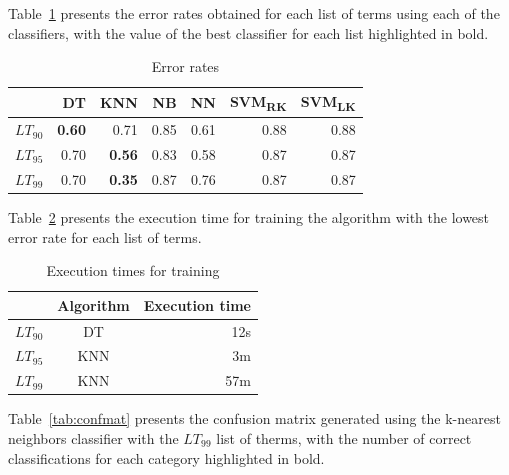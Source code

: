 \documentclass[conference]{IEEEtran}
\begin{document}
Table~\ref{tab:error} presents the error rates obtained for each list
of terms using each of the classifiers, with the value of the best
classifier for each list highlighted in bold.

\begin{table}[htbp]
    \caption{Error rates}
\begin{center}
\begin{tabular}{l|rrrrrr}
                 & DT            & KNN           & NB   & NN   & SVM\textsubscript{RK} & SVM\textsubscript{LK} \\ \hline
    $LT_{90}$    & \textbf{0.60} & 0.71          & 0.85 & 0.61 & 0.88                  & 0.88                  \\
    $LT_{95}$    & 0.70          & \textbf{0.56} & 0.83 & 0.58 & 0.87                  & 0.87                  \\
    $LT_{99}$    & 0.70          & \textbf{0.35} & 0.87 & 0.76 & 0.87                  & 0.87                  \\
\end{tabular}
\label{tab:error}
\end{center}
\end{table}

Table~\ref{tab:exectime} presents the execution time for training the
algorithm with the lowest error rate for each list of terms.

\begin{table}[htbp]
    \caption{Execution times for training}
\begin{center}
\begin{tabular}{lcr}
                 & Algorithm  & Execution time \\\hline
    $LT_{90}$    & DT         & 12s  \\
    $LT_{95}$    & KNN        &  3m  \\
    $LT_{99}$    & KNN        & 57m  \\
\end{tabular}
\label{tab:exectime}
\end{center}
\end{table}

Table~\ref{tab:confmat} presents the confusion matrix generated using
the k-nearest neighbors classifier with the $LT_{99}$ list of therms,
with the number of correct classifications for each category
highlighted in bold.
\end{document}
